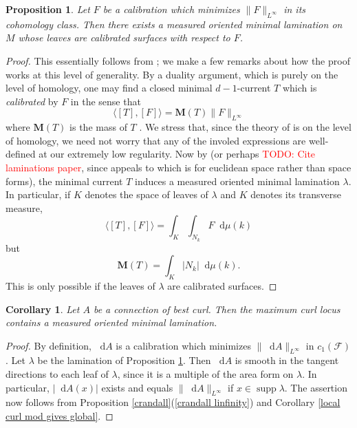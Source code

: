 \documentclass[reqno,11pt]{amsart}
\newcommand*\dif{\mathop{}\!\mathrm{d}}
\DeclareMathOperator{\supp}{supp}
\newcommand{\dfn}[1]{\emph{#1}\index{#1}}
\newtheorem{proposition}[theorem]{Proposition}
\newtheorem{corollary}[theorem]{Corollary}
\theoremstyle{definition}
\numberwithin{equation}{section}
\newcommand\todo[1]{\textcolor{red}{TODO: #1}}
\begin{document}
\begin{proposition}\label{Bangert Cui}
Let $F$ be a calibration which minimizes $\|F\|_{L^\infty}$ in its cohomology class.
Then there exists a measured oriented minimal lamination on $M$ whose leaves are calibrated surfaces with respect to $F$.
\end{proposition}
\begin{proof}
This essentially follows from \cite[Theorem 5.1]{bangert_cui_2017}; we make a few remarks about how the proof works at this level of generality.
By a duality argument, which is purely on the level of homology, one may find a closed minimal $d-1$-current $T$ which is \dfn{calibrated} by $F$ in the sense that
$$\langle [T], [F]\rangle = \mathbf M(T) \|F\|_{L^\infty}$$
where $\mathbf M(T)$ is the mass of $T$ \cite[Proposition 2.2]{bangert_cui_2017}.
We stress that, since the theory of \cite[\S2C]{bangert_cui_2017} is on the level of homology, we need not worry that any of the involed expressions are well-defined at our extremely low regularity.
Now by \cite[Theorem 1]{AUER20011095} (or perhaps \todo{Cite laminations paper}, since \cite{AUER20011095} appeals to \cite[\S37]{Simon84} which is for euclidean space rather than space forms), the minimal current $T$ induces a measured oriented minimal lamination $\lambda$.
In particular, if $K$ denotes the space of leaves of $\lambda$ and $K$ denotes its transverse measure,
$$\langle [T], [F]\rangle = \int_K \int_{N_k} F \dif \mu(k)$$
but 
$$\mathbf M(T) = \int_K |N_k| \dif \mu(k).$$
This is only possible if the leaves of $\lambda$ are calibrated surfaces.
\end{proof}

\begin{corollary}\label{best curl lamination}
Let $A$ be a connection of best curl.
Then the maximum curl locus contains a measured oriented minimal lamination.
\end{corollary}
\begin{proof}
By definition, $\dif A$ is a calibration which minimizes $\|\dif A\|_{L^\infty}$ in $c_1(\mathscr F)$.
Let $\lambda$ be the lamination of Proposition \ref{Bangert Cui}.
Then $\dif A$ is smooth in the tangent directions to each leaf of $\lambda$, since it is a multiple of the area form on $\lambda$.
In particular, $|\dif A(x)|$ exists and equals $\|\dif A\|_{L^\infty}$ if $x \in \supp \lambda$.
The assertion now follows from Proposition \ref{crandall}(\ref{crandall linfinity}) and Corollary \ref{local curl mod gives global}.
\end{proof}
\end{document}
